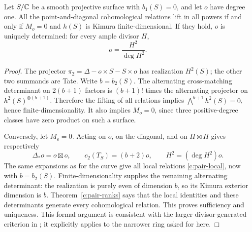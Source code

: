 \begin{proposition}
\label{c:surface-chow-criterion}
Let $S/\mathbb C$ be a smooth projective surface with $b_1(S)=0$, and let $o$ have degree one. All the point-and-diagonal cohomological relations lift in all powers if and only if $M_o=0$ and $h(S)$ is Kimura finite-dimensional. If they hold, $o$ is uniquely determined: for every ample divisor $H$,
\[
 o=\frac{H^2}{\deg H^2}.
\]
\end{proposition}

\begin{proof}
The projector $\pi_2=\Delta-o\times S-S\times o$ has realization $H^2(S)$; the other two summands are Tate. Write $b=b_2(S)$. The alternating cross-matching determinant on $2(b+1)$ factors is $(b+1)!$ times the alternating projector on $h^2(S)^{\otimes(b+1)}$. Therefore the lifting of all relations implies $\bigwedge^{b+1}h^2(S)=0$, hence finite-dimensionality. It also implies $M_o=0$, since three positive-degree classes have zero product on such a surface.

Conversely, let $M_o=0$. Acting on $o$, on the diagonal, and on $H\boxtimes H$ gives respectively
\[
 \Delta_*o=o\boxtimes o,\qquad c_2(T_S)=(b+2)o,
 \qquad H^2=(\deg H^2)o.
\]
The same expansions as for the curve give all local relations \eqref{c:pair-local}, now with $b=b_2(S)$. Finite-dimensionality supplies the remaining alternating determinant: the realization is purely even of dimension $b$, so its Kimura exterior dimension is $b$. Theorem~\ref{c:pair-ranks} says that the local identities and these determinants generate every cohomological relation. This proves sufficiency and uniqueness. This formal argument is consistent with the larger divisor-generated criterion in \citet[Proposition 4.5]{c_fulaterveervial2021}; it explicitly applies to the narrower ring asked for here.
\end{proof}

